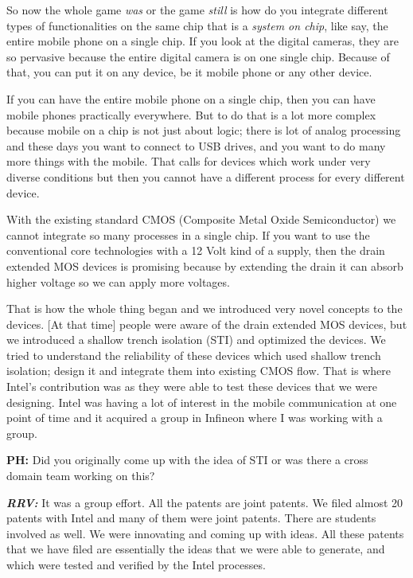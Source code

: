 \begin{multicols}{2}
So now the whole game \textit{was} or the game \textit{still} is how do you integrate different types of functionalities on the same chip that is a \textit{system on chip}, like say, the entire mobile phone on a single chip. If you look at the digital cameras, they are so pervasive because the entire digital camera is on one single chip. Because of that, you can put it on any device, be it mobile phone or any other device.

If you can have the entire mobile phone on a single chip, then you can have mobile phones practically everywhere. But to do that is a lot more complex because mobile on a chip is not just about logic; there is lot of analog processing and these days you want to connect to USB drives, and you want to do many more things with the mobile.  That calls for devices which work under very diverse conditions but then you cannot have a different process for every different device.

With the existing standard CMOS (Composite Metal  Oxide Semiconductor) we cannot integrate so many processes in a single chip. If you want to use the conventional core technologies with a 12 Volt kind of a supply, then the drain extended MOS devices is promising because by extending the drain it can absorb higher voltage so we can apply more voltages.

That is how the whole thing began and we introduced very novel concepts to the devices. [At that time] people were aware of the drain extended MOS devices, but we introduced a shallow trench isolation (STI) and optimized the devices. We tried to understand the reliability of these devices which used shallow trench isolation; design it and integrate them into existing CMOS flow. That is where Intel’s contribution was as they were able to test these devices that we were designing. Intel was having a lot of interest in the mobile communication at one point of time and it acquired a group in Infineon where I was working with a group.

\textbf{PH:} Did you originally come up with the idea of STI or was there a cross domain team working on this?

\textbf{\textit{RRV:}} It was a group effort. All the patents are joint patents. We filed almost 20 patents with Intel and many of them were joint patents. There are students involved as well. We were innovating and coming up with ideas. All these patents that we have filed are essentially the ideas that we were able to generate, and which were tested and verified by the Intel processes.


\end{multicols}
